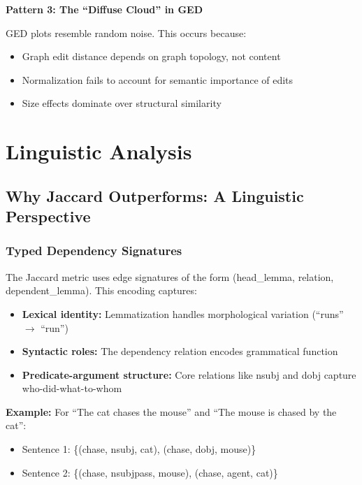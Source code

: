 \documentclass[11pt,a4paper]{article}
\begin{document}
\textbf{Pattern 3: The ``Diffuse Cloud'' in GED}

GED plots resemble random noise. This occurs because:
\begin{itemize}
    \item Graph edit distance depends on graph topology, not content
    \item Normalization fails to account for semantic importance of edits
    \item Size effects dominate over structural similarity
\end{itemize}

\section{Linguistic Analysis}

\subsection{Why Jaccard Outperforms: A Linguistic Perspective}

\subsubsection{Typed Dependency Signatures}

The Jaccard metric uses edge signatures of the form (head\_lemma, relation, dependent\_lemma). This encoding captures:

\begin{itemize}
    \item \textbf{Lexical identity:} Lemmatization handles morphological variation (``runs'' $\to$ ``run'')
    \item \textbf{Syntactic roles:} The dependency relation encodes grammatical function
    \item \textbf{Predicate-argument structure:} Core relations like nsubj and dobj capture who-did-what-to-whom
\end{itemize}

\textbf{Example:} For ``The cat chases the mouse'' and ``The mouse is chased by the cat'':
\begin{itemize}
    \item Sentence 1: \{(chase, nsubj, cat), (chase, dobj, mouse)\}
    \item Sentence 2: \{(chase, nsubjpass, mouse), (chase, agent, cat)\}
\end{itemize}
\end{document}

